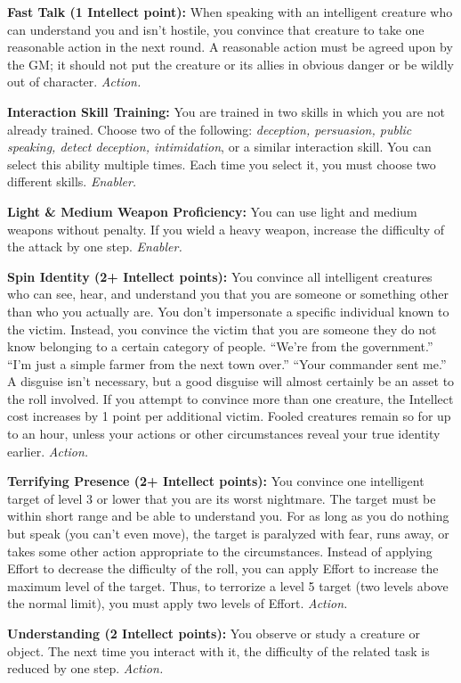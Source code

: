 \documentclass[a4paper,10pt,final,twocolumn,oneside]{book}
\newcommand{\itemAbility}[2]{\textcolor{25gray}{\textbullet\textbf{ #1:}}{ #2}\par}
\newcommand{\enabler}{\textit{ Enabler.}}
\newcommand{\action}{\textit{ Action.}}
\begin{document}
\itemAbility{Fast Talk (1 Intellect point)}{When speaking with an intelligent creature who can understand you and isn’t hostile, you convince that creature to take one reasonable action in the next round. A reasonable action must be agreed upon by the GM; it should not put the creature or its allies in obvious danger or be wildly out of character.\action}

\itemAbility{Interaction Skill Training}{You are trained in two skills in which you are not already trained. Choose two of the following: \textit{deception, persuasion, public speaking, detect deception, intimidation}, or a similar interaction skill. You can select this ability multiple times. Each time you select it, you must choose two different skills.\enabler}

\itemAbility{Light \& Medium Weapon Proficiency}{You can use light and medium weapons without penalty. If you wield a heavy weapon, increase the difficulty of the attack by one step.\enabler}

\itemAbility{Spin Identity (2+ Intellect points)}{You convince all intelligent creatures who can see, hear, and understand you that you are someone or something other than who you actually are. You don’t impersonate a specific individual known to the victim. Instead, you convince the victim that you are someone they do not know belonging to a certain category of people. “We’re from the government.” “I’m just a simple farmer from the next town over.” “Your commander sent me.” A disguise isn’t necessary, but a good disguise will almost certainly be an asset to the roll involved. If you attempt to convince more than one creature, the Intellect cost increases by 1 point per additional victim. Fooled creatures remain so for up to an hour, unless your actions or other circumstances reveal your true identity earlier.\action}

\itemAbility{Terrifying Presence (2+ Intellect points)}{ You convince one intelligent target of level 3 or lower that you are its worst nightmare. The target must be within short range and be able to understand you. For as long as you do nothing but speak (you can’t even move), the target is paralyzed with fear, runs away, or takes some other action appropriate to the circumstances. Instead of applying Effort to decrease the difficulty of the roll, you can apply Effort to increase the maximum level of the target. Thus, to terrorize a level 5 target (two levels above the normal limit), you must apply two levels of Effort.\action}

\itemAbility{Understanding (2 Intellect points)}{You observe or study a creature or object. The next time you interact with it, the difficulty of the related task is reduced by one step.\action}
\end{document}
